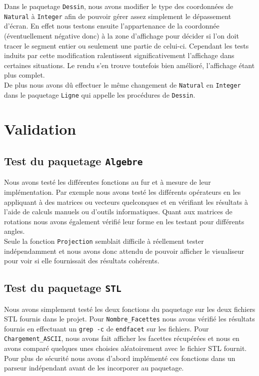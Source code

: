 \documentclass[10pt]{article}
\begin{document}
Dans le paquetage \lstinline!Dessin!, nous avons modifier le type des coordonnées de \lstinline!Natural! à \lstinline!Integer! afin de pouvoir gérer assez simplement le dépassement d'écran. En effet nous testons ensuite l'appartenance de la coordonnée (éventuellement négative donc) à la zone d'affichage pour décider si l'on doit tracer le segment entier ou seulement une partie de celui-ci. Cependant les tests induits par cette modification ralentissent significativement l'affichage dans certaines situations. Le rendu s'en trouve toutefois bien amélioré, l'affichage étant plus complet.\\
De plus nous avons dû effectuer le même changement de \lstinline!Natural! en \lstinline!Integer! dans le paquetage \lstinline!Ligne! qui appelle les procédures de \lstinline!Dessin!.

\section{Validation}

\subsection{Test du paquetage \lstinline!Algebre!}

Nous avons testé les différentes fonctions au fur et à mesure de leur implémentation. Par exemple nous avons testé les différents opérateurs en les appliquant à des matrices ou vecteurs quelconques et en vérifiant les résultats à l'aide de calculs manuels ou d'outils informatiques.
Quant aux matrices de rotations nous avons également vérifié leur forme en les testant pour différents angles.\\
Seule la fonction \lstinline!Projection! semblait difficile à réellement tester indépendamment et nous avons donc attendu de pouvoir afficher le visualiseur pour voir si elle fournissait des résultats cohérents.

\subsection{Test du paquetage \lstinline!STL!}

Nous avons simplement testé les deux fonctions du paquetage sur les deux fichiers STL fournis dans le projet. Pour \lstinline!Nombre_Facettes! nous avons vérifié les résultats fournis en effectuant un \lstinline!grep -c! de \lstinline!endfacet! sur les fichiers. Pour \lstinline!Chargement_ASCII!, nous avons fait afficher les facettes récupérées et nous en avons comparé quelques unes choisies aléatoirement avec le fichier STL fournit.\\
Pour plus de sécurité nous avons d'abord implémenté ces fonctions dans un parseur indépendant avant de les incorporer au paquetage.
\end{document}
